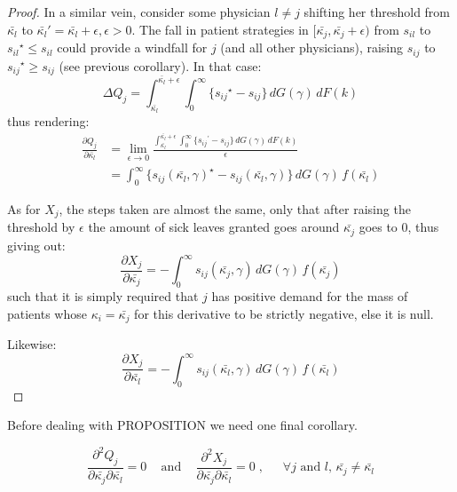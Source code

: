 \documentclass[../main.tex]{subfiles}
\begin{document}
\begin{proof}
In a similar vein, consider some physician $l \neq j$ shifting her threshold from $\bar{\kappa_{l}}$ to $\bar{\kappa_l}' = \bar{\kappa_l} + \epsilon, \epsilon > 0$. The fall in patient strategies in $[\bar{\kappa_j}, \bar{\kappa_j} + \epsilon)$ from $s_{il}$ to ${s_{il}}^{\star} \leq s_{il}$ could provide a windfall for $j$ (and all other physicians), raising $s_{ij}$ to ${s_{ij}}^{\star} \geq s_{ij}$ (see previous corollary). In that case:
\[
\Delta Q_j = \int_{\bar{\kappa_l}}^{\bar{\kappa_l} + \epsilon} \int_{0}^{\infty} \{ {s_{ij}}^{\star} - s_{ij}\} \,dG(\gamma) \,dF(k) 
\]
thus rendering:
\begin{align*}
    \frac{\partial Q_{j}}{\partial\bar{\kappa_{l}}} & = \lim_{\epsilon \rightarrow 0} \frac{\int_{\bar{\kappa_l}}^{\bar{\kappa_l} + \epsilon} \int_{0}^{\infty} \{ {s_{ij}}^{\prime} - s_{ij}\} \,dG(\gamma) \,dF(k)}{\epsilon} \\
    & = \int_{0}^{\infty} \{ {s_{ij}} (\bar{\kappa_l}, \gamma)^{\star} - s_{ij} (\bar{\kappa_l}, \gamma)\} \,dG(\gamma) \,f(\bar{\kappa_l}) 
\end{align*}

As for $X_j$, the steps taken are almost the same, only that after raising the threshold by $\epsilon$ the amount of sick leaves granted goes around $\bar{\kappa_j}$ goes to $0$, thus giving out:
\[
\frac{\partial X_{j}}{\partial\bar{\kappa_{j}}} = - \int_{0}^{\infty}  s_{ij} (\bar{\kappa_j}, \gamma) \,dG(\gamma) \,f(\bar{\kappa_j})
\]
such that it is simply required that $j$ has positive demand for the mass of patients whose $\kappa_i = \bar{\kappa_j}$ for this derivative to be strictly negative, else it is null.

Likewise:
\[
\frac{\partial X_{j}}{\partial\bar{\kappa_{l}}} = - \int_{0}^{\infty}  s_{ij} (\bar{\kappa_l}, \gamma) \,dG(\gamma) \,f(\bar{\kappa_l})
\]

\end{proof}

Before dealing with PROPOSITION we need one final corollary.

\begin{corollary}
\[
\frac{\partial^2 Q_{j}}{\partial\bar{\kappa_{j}} \partial\bar{\kappa_{l}}} = 0 \;\;\; \text{ and } \;\;\; \frac{\partial^2 X_{j}}{\partial\bar{\kappa_{j}} \partial\bar{\kappa_{l}}} = 0 \;, \;\;\; \text{ $\forall j$ and $l$, $\bar{\kappa_{j}} \neq \bar{\kappa_{l}}$}
\]
 \end{corollary}
\end{document}
